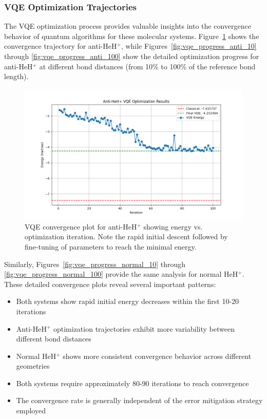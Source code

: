 \documentclass[10pt,twocolumn,a4paper]{article}
\begin{document}
\subsubsection{VQE Optimization Trajectories}
The VQE optimization process provides valuable insights into the convergence behavior of quantum algorithms for these molecular systems. Figure~\ref{fig:vqe_convergence_anti} shows the convergence trajectory for anti-HeH$^+$, while Figures~\ref{fig:vqe_progress_anti_10} through \ref{fig:vqe_progress_anti_100} show the detailed optimization progress for anti-HeH$^+$ at different bond distances (from 10\% to 100\% of the reference bond length).

\begin{figure}[t!]
    \centering
    \includegraphics[width=\columnwidth]{graphs/vqe_final_anti_heh+.png}
    \caption{VQE convergence plot for anti-HeH$^+$ showing energy vs. optimization iteration. Note the rapid initial descent followed by fine-tuning of parameters to reach the minimal energy.}
    \label{fig:vqe_convergence_anti}
\end{figure}

Similarly, Figures~\ref{fig:vqe_progress_normal_10} through \ref{fig:vqe_progress_normal_100} provide the same analysis for normal HeH$^+$. These detailed convergence plots reveal several important patterns:

\begin{itemize}
    \item Both systems show rapid initial energy decreases within the first 10-20 iterations
    \item Anti-HeH$^+$ optimization trajectories exhibit more variability between different bond distances
    \item Normal HeH$^+$ shows more consistent convergence behavior across different geometries
    \item Both systems require approximately 80-90 iterations to reach convergence
    \item The convergence rate is generally independent of the error mitigation strategy employed
\end{itemize}
\end{document}
